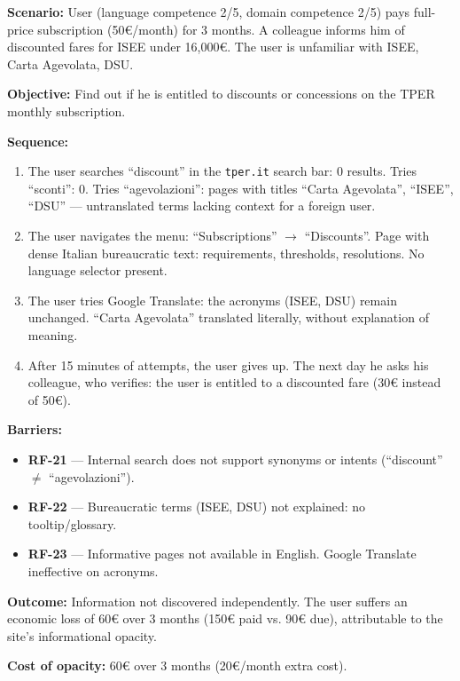﻿\documentclass[11pt,a4paper]{article}
\begin{document}
\begin{tcolorbox}[base]
    {\small
    \textbf{Scenario:} User (language competence 2/5, domain competence 2/5) pays full-price subscription (50\euro{}/month) for 3 months. A colleague informs him of discounted fares for ISEE under 16,000\euro{}. The user is unfamiliar with ISEE, Carta Agevolata, DSU.

    \textbf{Objective:} Find out if he is entitled to discounts or concessions on the TPER monthly subscription.

    \textbf{Sequence:}
    \begin{enumerate}
        \item The user searches ``discount'' in the \texttt{tper.it} search bar: 0 results. Tries ``sconti'': 0. Tries ``agevolazioni'': pages with titles ``Carta Agevolata'', ``ISEE'', ``DSU'' --- untranslated terms lacking context for a foreign user.
        \item The user navigates the menu: ``Subscriptions'' $\rightarrow$ ``Discounts''. Page with dense Italian bureaucratic text: requirements, thresholds, resolutions. No language selector present.
        \item The user tries Google Translate: the acronyms (ISEE, DSU) remain unchanged. ``Carta Agevolata'' translated literally, without explanation of meaning.
        \item After 15 minutes of attempts, the user gives up. The next day he asks his colleague, who verifies: the user is entitled to a discounted fare (30\euro{} instead of 50\euro{}).
    \end{enumerate}

    \textbf{Barriers:}
    \begin{itemize}
        \item \textbf{RF-21} --- Internal search does not support synonyms or intents (``discount'' $\neq$ ``agevolazioni'').
        \item \textbf{RF-22} --- Bureaucratic terms (ISEE, DSU) not explained: no tooltip/glossary.
        \item \textbf{RF-23} --- Informative pages not available in English. Google Translate ineffective on acronyms.
    \end{itemize}

    \textbf{Outcome:} Information not discovered independently. The user suffers an economic loss of 60\euro{} over 3 months (150\euro{} paid vs. 90\euro{} due), attributable to the site's informational opacity.

    \textbf{Cost of opacity:} 60\euro{} over 3 months (20\euro{}/month extra cost).
    }
\end{tcolorbox}
\end{document}
